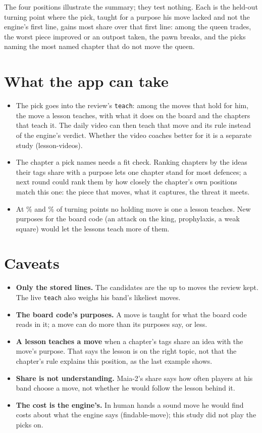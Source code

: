 \documentclass[11pt]{article}
\begin{document}
The four positions illustrate the summary; they test nothing. Each is the held-out turning point
where the pick, taught for a purpose his move lacked and not the engine's first line, gains most
share over that first line: among the queen trades, the worst piece improved or an outpost taken,
the pawn breaks, and the picks naming the most named chapter that do not move the queen.


\section{What the app can take}

\begin{itemize}[nosep]
\item The pick goes into the review's \texttt{teach}: among the moves that hold for him, the move
  a lesson teaches, with what it does on the board and the chapters that teach it. The daily video
  can then teach that move and its rule instead of the engine's verdict. Whether the video
  coaches better for it is a separate study (lesson-videos).
\item The chapter a pick names needs a fit check. Ranking chapters by the ideas their tags share
  with a purpose lets one chapter stand for most defences; a next round could rank them by how
  closely the chapter's own positions match this one: the piece that moves, what it captures, the
  threat it meets.
\item At \TrainNoLesson\% and \HeldNoLesson\% of turning points no holding move is one a lesson
  teaches. New purposes for the board code (an attack on the king,
  prophylaxis, a weak square) would let the lessons teach more of them.
\end{itemize}

\section{Caveats}

\begin{itemize}[nosep]
\item \textbf{Only the stored lines.} The candidates are the up to \MaxCandidates{} moves the
  review kept. The live \texttt{teach} also weighs his band's likeliest moves.
\item \textbf{The board code's purposes.} A move is taught for what the board code reads in it;
  a move can do more than its purposes say, or less.
\item \textbf{A lesson teaches a move} when a chapter's tags share an idea with the move's
  purpose. That says the lesson is on the right topic, not that the chapter's rule explains this
  position, as the last example shows.
\item \textbf{Share is not understanding.} Maia-2's share says how often players at his band
  choose a move, not whether he would follow the lesson behind it.
\item \textbf{The cost is the engine's.} In human hands a sound move he would find costs about
  what the engine says (findable-move); this study did not play the picks on.
\end{itemize}
\end{document}
